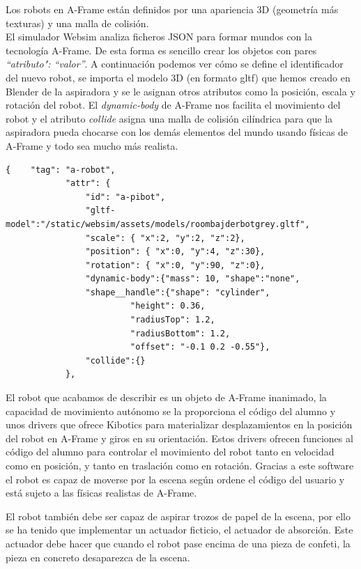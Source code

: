 Los robots en A-Frame están definidos por una apariencia 3D (geometría más texturas) y una malla de colisión.
\\
El simulador Websim analiza ficheros JSON para formar mundos con la tecnología A-Frame. De esta forma es sencillo crear los objetos con pares \textit{``atributo": ``valor''}. A continuación podemos ver cómo se define el identificador del nuevo robot, se importa el modelo 3D (en formato gltf) que hemos creado en Blender de la aspiradora y se le asignan otros atributos como la posición, escala y rotación del robot. El \textit{dynamic-body} de A-Frame nos facilita el movimiento del robot y el atributo \textit{collide} asigna una malla de colisión cilíndrica para que la aspiradora pueda chocarse con los demás elementos del mundo usando físicas de A-Frame y todo sea mucho más realista.


\begin{lstlisting}
{    "tag": "a-robot",
            "attr": {
                "id": "a-pibot",
                "gltf-model":"/static/websim/assets/models/roombajderbotgrey.gltf",
                "scale": { "x":2, "y":2, "z":2},
                "position": { "x":0, "y":4, "z":30},
                "rotation": { "x":0, "y":90, "z":0},
                "dynamic-body":{"mass": 10, "shape":"none",
                "shape__handle":{"shape": "cylinder",
                         "height": 0.36,
                         "radiusTop": 1.2,
                         "radiusBottom": 1.2,
                         "offset": "-0.1 0.2 -0.55"},
                "collide":{}
            },
\end{lstlisting}

El robot que acabamos de describir es un objeto de A-Frame inanimado, la capacidad de movimiento autónomo se la proporciona el código del alumno y unos drivers que ofrece Kibotics para materializar desplazamientos en la posición del robot en A-Frame y giros en su orientación. Estos drivers ofrecen funciones al código del alumno para controlar el movimiento del robot tanto en velocidad como en posición, y tanto en traslación como en rotación. Gracias a este software el robot es capaz de moverse por la escena según ordene el código del usuario y está sujeto a las físicas realistas de A-Frame.

El robot también debe ser capaz de aspirar trozos de papel de la escena, por ello se ha tenido que implementar un actuador ficticio, el actuador de absorción. Este actuador debe hacer que cuando el robot pase encima de una pieza de confeti, la pieza en concreto desaparezca de la escena.

